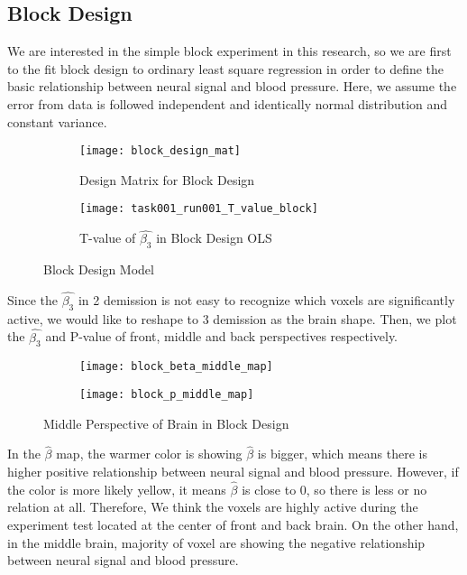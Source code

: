 \subsection{Block Design}

We are interested in the simple block experiment in this research, so we are 
first to the fit block design to ordinary least square regression in order to
define the basic relationship between neural signal and blood pressure. Here, 
we assume the error from data is followed independent and identically normal
distribution and constant variance.

\begin{figure}[!h]
\centering
\begin{subfigure}{.42\textwidth}
\texttt{[image: block\_design\_mat]}
\centering
\caption{Design Matrix for Block Design\label{fig:blockDM}}
\end{subfigure}%
\begin{subfigure}{.48\textwidth}
\texttt{[image: task001\_run001\_T\_value\_block]}
\centering
\caption{T-value of $\hat{\beta_{3}}$ in Block Design OLS\label{fig:tvalOLS}}
\end{subfigure}
\caption{Block Design Model\label{fig:blockDM}}
\end{figure}

Since the $\hat{\beta_{3}}$ in 2 demission is not easy to recognize which voxels
are significantly active, we would like to reshape to 3 demission as the brain 
shape. Then, we plot the $\hat{\beta_{3}}$ and P-value of front, middle and 
back perspectives respectively.

\begin{figure}[!h]
\centering
\begin{subfigure}{.45\textwidth}
  \texttt{[image: block\_beta\_middle\_map]}
\end{subfigure}%
\begin{subfigure}{.5\textwidth}
  \texttt{[image: block\_p\_middle\_map]}
  \centering
\end{subfigure}
\caption{Middle Perspective of Brain in Block Design\label{fig:mpBrain}}
\end{figure}

In the $\hat{\beta}$ map, the warmer color is showing $\hat{\beta}$ is 
bigger, which means there is higher positive relationship between neural signal and
blood pressure. However, if the color is more likely yellow, it means 
$\hat{\beta}$ is close to 0, so there is less or no relation at all. 
Therefore, We think the voxels are highly active during the experiment test 
located at the center of front and back brain. On the other hand, in the middle
brain, majority of voxel are showing the negative relationship between neural
signal and blood pressure.

